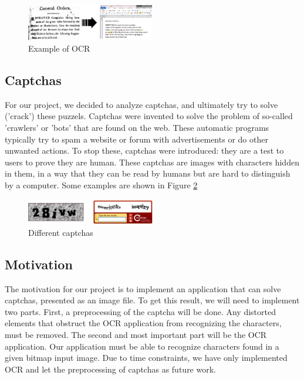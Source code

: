 \documentclass{article}
\begin{document}
\begin{figure} [H]
	\centering
	\includegraphics[width=0.5\textwidth]{images/OCRex.png}
	\caption{Example of OCR}\label{fig:OCRex}
\end{figure}

\subsection{Captchas}
For our project, we decided to analyze captchas, and ultimately try to solve ('crack') these puzzels. Captchas were invented to solve the problem of so-called 'crawlers' or 'bots' that are found on the web. These automatic programs typically try to spam a website or forum with advertisements or do other unwanted actions. To stop these, captchas were introduced: they are a test to users to prove they are human. These captchas are images with characters hidden in them, in a way that they can be read by humans but are hard to distinguish by a computer. Some examples are shown in Figure \ref{fig:captchas}

\begin{figure}[H]
	\centering
	\includegraphics[width=0.5\textwidth]{images/captchas.png}
	\caption{Different captchas}\label{fig:captchas}
\end{figure}
 
\subsection{Motivation}
The motivation for our project is to implement an application that can solve captchas, presented as an image file. To get this result, we will need to implement two parts. First, a preprocessing of the captcha will be done. Any distorted elements that obstruct the OCR application from recognizing the characters, must be removed. The second and most important part will be the OCR application. Our application must be able to recognize characters found in a given bitmap input image. Due to time constraints, we have only implemented OCR and let the preprocessing of captchas as future work.
\end{document}
